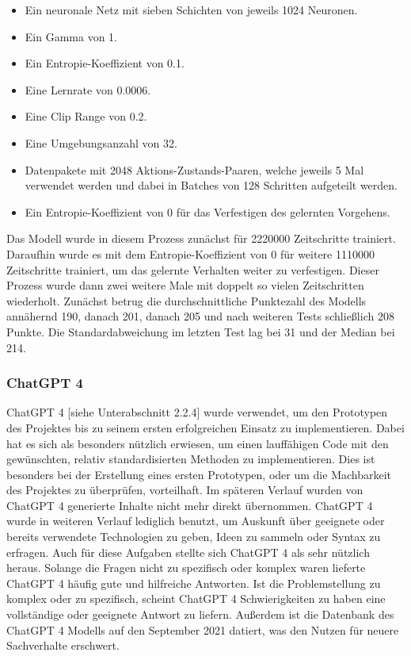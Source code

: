 \begin{itemize} 
\item Ein neuronale Netz mit sieben Schichten von jeweils 1024 Neuronen. 

\item Ein Gamma von 1. 

\item Ein Entropie-Koeffizient von 0.1. 

\item Eine Lernrate von 0.0006. 

\item Eine Clip Range von 0.2. 

\item Eine Umgebungsanzahl von 32. 

\item Datenpakete mit 2048 Aktions-Zustands-Paaren, welche jeweils 5 Mal verwendet werden und dabei in Batches von 128 Schritten aufgeteilt werden. 

\item Ein Entropie-Koeffizient von 0 für das Verfestigen des gelernten Vorgehens. 
\end{itemize} 

Das Modell wurde in diesem Prozess zunächst für 2220000 Zeitschritte trainiert. Daraufhin wurde es mit dem Entropie-Koeffizient von 0 für weitere 1110000 Zeitschritte trainiert, um das gelernte Verhalten weiter zu verfestigen. Dieser Prozess wurde dann zwei weitere Male mit doppelt so vielen Zeitschritten wiederholt. Zunächst betrug die durchschnittliche Punktezahl des Modells annähernd 190, danach 201, danach 205 und nach weiteren Tests schließlich 208 Punkte. Die Standardabweichung im letzten Test lag bei 31 und der Median bei 214.


\subsubsection{ChatGPT 4}
ChatGPT 4 [siehe Unterabschnitt 2.2.4] wurde verwendet, um den Prototypen des Projektes bis zu seinem ersten erfolgreichen Einsatz zu implementieren. Dabei hat es sich als besonders nützlich erwiesen, um einen lauffähigen Code mit den gewünschten, relativ standardisierten Methoden zu implementieren. Dies ist besonders bei der Erstellung eines ersten Prototypen, oder um die Machbarkeit des Projektes zu überprüfen, vorteilhaft. Im späteren Verlauf wurden von ChatGPT 4 generierte Inhalte nicht mehr direkt übernommen. ChatGPT 4 wurde in weiteren Verlauf lediglich benutzt, um Auskunft über geeignete oder bereits verwendete Technologien zu geben, Ideen zu sammeln oder Syntax zu erfragen. Auch für diese Aufgaben stellte sich ChatGPT 4 als sehr nützlich heraus. Solange die Fragen nicht zu spezifisch oder komplex waren lieferte ChatGPT 4 häufig gute und hilfreiche Antworten. Ist die Problemstellung zu komplex oder zu spezifisch, scheint ChatGPT 4 Schwierigkeiten zu haben eine vollständige oder geeignete Antwort zu liefern. Außerdem ist die Datenbank des ChatGPT 4 Modells auf den September 2021 datiert, was den Nutzen für neuere Sachverhalte erschwert.